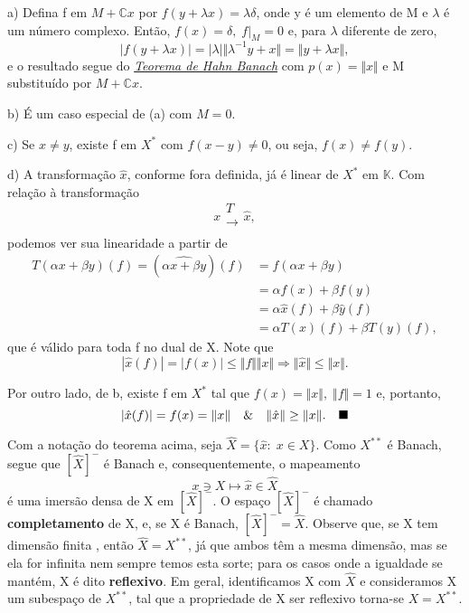 \documentclass[../functional_analysis.tex]{subfiles}
\begin{document}
 \begin{proof*}
  a) Defina f em \(M+\mathbb{C}x\) por \(f(y+\lambda x)=\lambda \delta \), onde y é um elemento de M e \( \lambda \) é um número complexo. Então, \(f(x)=\delta ,\; f|_{M}=0\) e, para \(\lambda \) diferente de zero, 
    \[
      |f(y+\lambda x)|=|\lambda |\Vert \lambda^{-1}y + x \Vert=\Vert y+\lambda x \Vert,
    \]
    e o resultado segue do \hyperlink{complex_hahn_banach}{\textit{Teorema de Hahn Banach}} com \(p(x)=\Vert x \Vert\) e M substituído por \(M + \mathbb{C}x\).

  b) É um caso especial de (a) com \(M=0.\)

  c) Se \(x\neq y\), existe f em \(X^{*}\) com \(f(x-y)\neq 0\), ou seja, \(f(x)\neq f(y)\). 

  d) A transformação \(\hat{x}\), conforme fora definida, já é linear de \(X^{*}\) em \(\mathbb{K}.\) Com relação à transformação 
    \[
      x\substack{T \\ \longrightarrow \\ }\hat{x},
    \]
    podemos ver sua linearidade a partir de 
   \begin{align*}
     T(\alpha x+\beta y)(f)=(\hat{\alpha x+\beta y})(f)&=f(\alpha x+\beta y)\\ 
                                                       &=\alpha f(x)+ \beta f(y)\\ 
                                                       &=\alpha \hat{x}(f)+\beta \hat{y}(f)\\ 
                                                       &=\alpha T(x)(f)+\beta T(y)(f),
   \end{align*}
   que é válido para toda f no dual de X. Note que 
     \[
       |\hat{x}(f)|=|f(x)|\leq \Vert f \Vert \Vert x \Vert \Rightarrow \Vert \hat{x} \Vert \leq \Vert x \Vert.
     \]

     Por outro lado, de b, existe f em \(X^{*}\) tal que \(f(x)=\Vert x \Vert,\; \Vert f \Vert=1\) e, portanto,
       \[
         |\hat{x}(f)| = f(x) = \Vert x \Vert \quad\&\quad \Vert \hat{x} \Vert\geq \Vert x \Vert.\quad \text{$\blacksquare$}
       \] 
 \end{proof*}

 Com a notação do teorema acima, seja \(\hat{X}=\{\hat{x}:\; x\in X\}.\) Como \(X^{**}\) é Banach, segue que \([\hat{X}]^{-}\) é Banach e, consequentemente, o mapeamento 
   \[
     x\ni X \mapsto \hat{x}\in \hat{X}
   \]
   é uma imersão densa de X em \([\hat{X}]^{-}\). O espaço \([\hat{X}]^{-}\) é chamado \textbf{completamento} de X, e, se X é Banach, \([\hat{X}]^{-}=\hat{X}.\) Observe que, se X tem dimensão finita , então \(\hat{X}=X^{**}\), já que ambos têm a mesma dimensão, mas se ela for infinita nem sempre temos esta sorte; para os casos onde a igualdade se mantém, X é dito \textbf{reflexivo}. Em geral, identificamos X com \(\hat{X}\) e consideramos X um subespaço de \(X^{**}\), tal que a propriedade de X ser reflexivo torna-se \(X=X^{**}.\)
\end{document}
